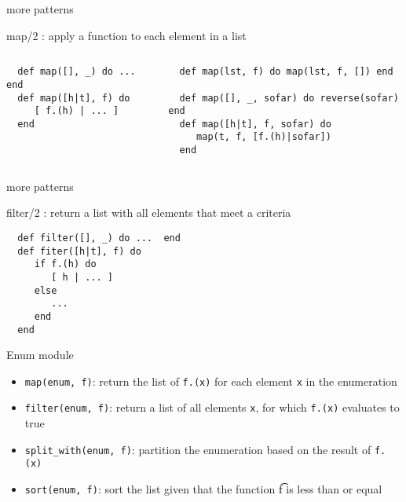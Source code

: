 \begin{frame}[fragile]{more patterns}

  map/2 :  apply a function to each element in a list
  \pause
  \begin{columns}
    \begin{column}{.5\linewidth}
\begin{verbatim}
  def map([], _) do ...  end
  def map([h|t], f) do 
     [ f.(h) | ... ]
  end
\end{verbatim}  
    \end{column}
    \pause
    \begin{column}{.5\linewidth}
\begin{verbatim}
  def map(lst, f) do map(lst, f, []) end

  def map([], _, sofar) do reverse(sofar) end
  def map([h|t], f, sofar) do 
     map(t, f, [f.(h)|sofar])
  end
\end{verbatim}  
    \end{column}
  \end{columns}
  
\end{frame}

\begin{frame}[fragile]{more patterns}

  filter/2 :  return a list with all elements that meet a criteria 
  \pause

\begin{verbatim}
  def filter([], _) do ...  end
  def fiter([h|t], f) do 
     if f.(h) do 
        [ h | ... ]
     else 
        ...
     end
  end
\end{verbatim}  
  
\end{frame}

\begin{frame}{Enum module}

\begin{itemize}
\item {\tt map(enum, f)}: return the list of {\tt f.(x)} for each element {\tt x} in the enumeration
\pause 
\item {\tt filter(enum, f)}: return a list of all elements {\tt x}, for which {\tt f.(x)} evaluates to true
\pause
\item {\tt split_with(enum, f)}: partition the enumeration based on the result of  {\tt f.(x)}
\pause
\item {\tt sort(enum, f)}: sort the list given that the function {\t f} is less than or equal
\end{itemize}

\end{frame}


